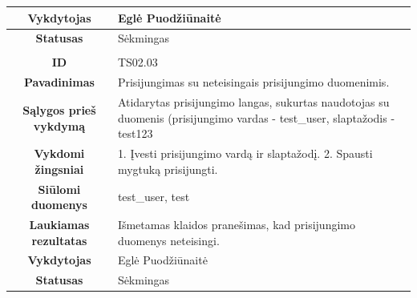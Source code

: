 \documentclass{VUMIFPSkursinis}
\begin{document}
	\begin{table}[H]
		\begin{tabular}{|p{6cm}|p{11cm}|}
			\hline
			\multicolumn{1}{|c|}{{\bfseries Vykdytojas}}&
			{Eglė Puodžiūnaitė}\\
			\hline
			\multicolumn{1}{|c|}{{\bfseries Statusas}}&
			{Sėkmingas}\\
			\hline
			\rowcolor{lightgray}
			\multicolumn{2}{|c|}{}\\
			\hline
			\multicolumn{1}{|c|}{{\bfseries ID}}&
			{TS02.03}\\
			\hline
			\multicolumn{1}{|c|}{{\bfseries Pavadinimas}}&
			{Prisijungimas su neteisingais prisijungimo duomenimis.}\\
			\hline
			\multicolumn{1}{|c|}{{\bfseries Sąlygos prieš vykdymą}}&
			{Atidarytas prisijungimo langas, sukurtas naudotojas su duomenis (prisijungimo vardas - test\_user, slaptažodis - test123}\\
			\hline
			\multicolumn{1}{|c|}{{\bfseries Vykdomi žingsniai}}&
			{1. Įvesti prisijungimo vardą ir slaptažodį.
			 2. Spausti mygtuką prisijungti.}\\
			\hline
			\multicolumn{1}{|c|}{{\bfseries Siūlomi duomenys}}&
			{test\_user, test}\\
			\hline
			\multicolumn{1}{|c|}{{\bfseries Laukiamas rezultatas}}&
			{Išmetamas klaidos pranešimas, kad prisijungimo duomenys neteisingi.}\\
			\hline
			\multicolumn{1}{|c|}{{\bfseries Vykdytojas}}&
			{Eglė Puodžiūnaitė}\\
			\hline
			\multicolumn{1}{|c|}{{\bfseries Statusas}}&
			{Sėkmingas}\\
			\hline
		\end{tabular}
	\end{table}	
\end{document}
